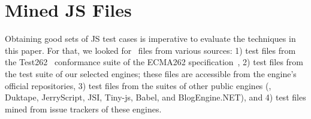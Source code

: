\documentclass[smallextended]{svjour3}
\begin{document}

\section{Mined JS Files}
\label{sec:seeds}

Obtaining good sets of JS test cases is imperative to evaluate the
techniques in this paper. For that, we looked for \js\ files from
various sources: 1) test files from the Test262~\cite{tc39-github}
conformance suite of the ECMA262 specification~\cite{ecmas262-spec},
2) test files from the test suite of our selected engines; these files
are accessible from the engine's official repositories, 3) test files
from the suites of other public engines (\ie{}, Duktape, JerryScript,
JSI, Tiny-js, Babel, and BlogEngine.NET),
and 4) test files mined from issue trackers of these
engines.


\newcommand\marktopleft[1]{%
    \tikz[overlay,remember picture]
        \node (marker-#1-a) at (0,2ex) {};%
}
\newcommand\markbottomright[1]{%
    \tikz[overlay,remember picture]
        \node (marker-#1-b) at (0,0) {};%
    \tikz[overlay,remember picture,thick,dashed,inner sep=2pt]
        \node[draw,rectangle,fit=(marker-#1-a.center) (marker-#1-b.center)] {};%
}
\end{document}
